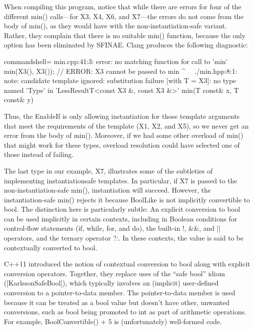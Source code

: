 When compiling this program, notice that while there are errors for four of the different min() calls—for X3, X4, X6, and X7—the errors do not come from the body of min(), as they would have with the non-instantiation-safe variant. Rather, they complain that there is no suitable min() function, because the only option has been eliminated by SFINAE. Clang produces the following diagnostic:

\begin{tcblisting}{commandshell={}}
min.cpp:41:3: error: no matching function for call to ’min’
min(X3(), X3()); // ERROR: X3 cannot be passed to min
^~~
./min.hpp:8:1: note: candidate template ignored: substitution failure
[with T = X3]: no type named ’Type’ in
’LessResultT<const X3 &, const X3 &>’
min(T const& x, T const& y)
\end{tcblisting}

Thus, the EnableIf is only allowing instantiation for those template arguments that meet the requirements of the template (X1, X2, and X5), so we never get an error from the body of min(). Moreover, if we had some other overload of min() that might work for these types, overload resolution could have selected one of those instead of failing.

The last type in our example, X7, illustrates some of the subtleties of implementing instantiationsafe templates. In particular, if X7 is passed to the non-instantiation-safe min(), instantiation will succeed. However, the instantiation-safe min() rejects it because BoolLike is not implicitly convertible to bool. The distinction here is particularly subtle: An explicit conversion to bool can be used implicitly in certain contexts, including in Boolean conditions for control-flow statements (if, while, for, and do), the built-in !, \&\&, and || operators, and the ternary operator ?:. In these contexts, the value is said to be contextually converted to bool.

\begin{tcolorbox}[colback=webgreen!5!white,colframe=webgreen!75!black]
\hspace*{0.75cm}C++11 introduced the notion of contextual conversion to bool along with explicit conversion operators. Together, they replace uses of the “safe bool” idiom ([KarlssonSafeBool]), which typically involves an (implicit) user-defined conversion to a pointer-to-data member. The pointer-to-data member is used because it can be treated as a bool value but doesn’t have other, unwanted conversions, such as bool being promoted to int as part of arithmetic operations. For example, BoolConvertible() + 5 is (unfortunately) well-formed code.
\end{tcolorbox}

